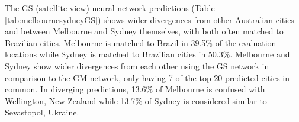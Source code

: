 \documentclass[10pt,letterpaper,hidelinks]{article}
\begin{document}
\begin{table}[!htbp]
\begin{adjustwidth}{-2.25in}{0in}
\begin{tabular}{ l l l l l}
\hline
\end{tabular}
\end{adjustwidth}
\end{table}

The GS (satellite view) neural network predictions (Table \ref{tab:melbournesydneyGS}) shows wider divergences from other Australian cities and between Melbourne and Sydney themselves, with both often matched to Brazilian cities. Melbourne is matched to Brazil in 39.5\% of the evaluation locations while Sydney is matched to Brazilian cities in 50.3\%. Melbourne and Sydney show wider divergences from each other using the GS network in comparison to the GM network, only having 7 of the top 20 predicted cities in common. In diverging predictions, 13.6\% of Melbourne is confused with Wellington, New Zealand while 13.7\% of Sydney is considered similar to Sevastopol, Ukraine. 
\end{document}
